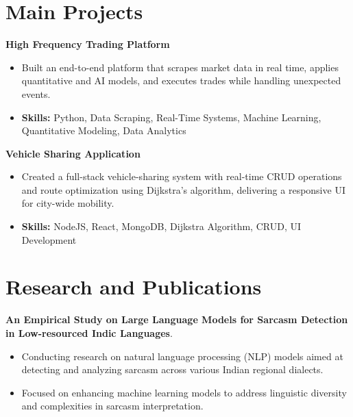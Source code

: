 \documentclass[a4paper,11pt]{article}
\begin{document}
\section{\textbf{Main Projects}}

\vspace{1mm}
  \textbf{High Frequency Trading Platform  }
\vspace{-1.5mm} %
\begin{itemize}
  \item Built an end-to-end platform that scrapes market data in real time, applies quantitative and AI models, and executes trades while handling unexpected events.
\vspace{-3mm}
  \item \textbf{Skills:} Python, Data Scraping, Real-Time Systems, Machine Learning, Quantitative Modeling, Data Analytics
\end{itemize}


\vspace{1mm}
   \textbf{Vehicle Sharing Application }
\vspace{-1.5mm} %
\begin{itemize}
  \item Created a full-stack vehicle-sharing system with real-time CRUD operations and route optimization using Dijkstra's algorithm, delivering a responsive UI for city-wide mobility.
\vspace{-3mm}
  \item \textbf{Skills:} NodeJS, React, MongoDB, Dijkstra Algorithm, CRUD, UI Development
\end{itemize}



\section{\textbf{Research and Publications} \hfill }
\vspace{1mm}
  \textbf{An Empirical Study on Large Language Models for Sarcasm Detection in Low-resourced Indic Languages}.
\vspace{-1mm} %
\begin{itemize}
  \item Conducting research on natural language processing (NLP) models aimed at detecting and analyzing sarcasm across various Indian regional dialects.
\vspace{-3mm}
  \item Focused on enhancing machine learning models to address linguistic diversity and complexities in sarcasm interpretation.
\end{itemize}
\end{document}
